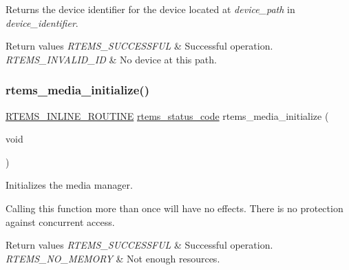 Returns the device identifier for the device located at {\itshape device\+\_\+path} in {\itshape device\+\_\+identifier}. 


\begin{DoxyRetVals}{Return values}
{\em R\+T\+E\+M\+S\+\_\+\+S\+U\+C\+C\+E\+S\+S\+F\+UL} & Successful operation. \\
\hline
{\em R\+T\+E\+M\+S\+\_\+\+I\+N\+V\+A\+L\+I\+D\+\_\+\+ID} & No device at this path. \\
\hline
\end{DoxyRetVals}
\mbox{\label{group__RTEMSIOMedia_ga646cab27cb0119184f8831a28c02c603}} 
\subsubsection{\texorpdfstring{rtems\_media\_initialize()}{rtems\_media\_initialize()}}
{\footnotesize\ttfamily \mbox{\hyperlink{group__RTEMSScoreBaseDefs_gac216239df231d5dbd15e3520b0b9313f}{R\+T\+E\+M\+S\+\_\+\+I\+N\+L\+I\+N\+E\+\_\+\+R\+O\+U\+T\+I\+NE}} \mbox{\hyperlink{group__ClassicStatus_ga545d41846817eaba6143d52ee4d9e9fe}{rtems\+\_\+status\+\_\+code}} rtems\+\_\+media\+\_\+initialize (\begin{DoxyParamCaption}\item[{void}]{ }\end{DoxyParamCaption})}



Initializes the media manager. 

Calling this function more than once will have no effects. There is no protection against concurrent access.


\begin{DoxyRetVals}{Return values}
{\em R\+T\+E\+M\+S\+\_\+\+S\+U\+C\+C\+E\+S\+S\+F\+UL} & Successful operation. \\
\hline
{\em R\+T\+E\+M\+S\+\_\+\+N\+O\+\_\+\+M\+E\+M\+O\+RY} & Not enough resources. \\
\hline
\end{DoxyRetVals}
\mbox{\label{group__RTEMSIOMedia_ga6f362dfc1a9ad18caeaca0debb68e9d9}} 
